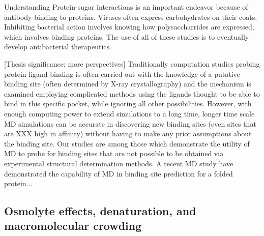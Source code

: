 Understanding Protein-sugar interactions is an important endeavor because of antibody binding to proteins.  Viruses often express carbohydrates on their coats.  Inhibiting bacterial action involves knowing how polysaccharrides are expressed, which involves binding proteins.  The use of all of these studies is to eventually develop antibacterial therapeutics. %


[Thesis significance; more perspectives] Traditionally computation studies probing protein-ligand binding is often carried out with the knowledge of a putative binding site (often determined by X-ray crystallography) and the mechanism is examined employing complicated methods using the ligands thought to be able to bind in this specific pocket, while ignoring all other possibilities.  However, with enough computing power to extend simulations to a long time, longer time scale MD simulations can be accurate in discovering new binding sites (even sites that are XXX high in affinity) without having to make any prior assumptions about the binding site. Our studies are among those which demonstrate the utility of MD to probe for binding sites that are not possible to be obtained via experimental structural determination methods.  A recent MD study have demonstrated the capability of MD in binding site prediction for a folded protein...\cite{Shan:2011bo}



\subsection{Osmolyte effects, denaturation, and macromolecular crowding}

